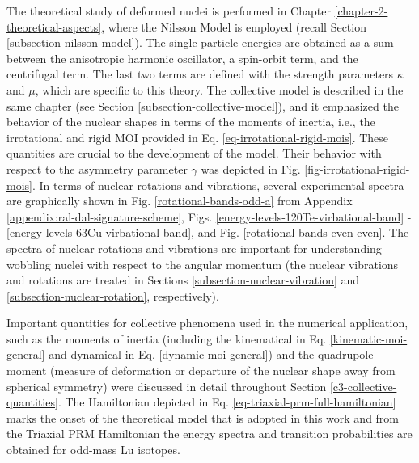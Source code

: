 The theoretical study of deformed nuclei is performed in Chapter \ref{chapter-2-theoretical-aspects}, where the Nilsson Model is employed (recall Section \ref{subsection-nilsson-model}). The single-particle energies are obtained as a sum between the anisotropic harmonic oscillator, a spin-orbit term, and the centrifugal term. The last two terms are defined with the strength parameters $\kappa$ and $\mu$, which are specific to this theory. The collective model is described in the same chapter (see Section \ref{subsection-collective-model}), and it emphasized the behavior of the nuclear shapes in terms of the moments of inertia, i.e., the irrotational and rigid MOI provided in Eq. \eqref{eq-irrotational-rigid-mois}. These quantities are crucial to the development of the model. Their behavior with respect to the asymmetry parameter $\gamma$ was depicted in Fig. \ref{fig-irrotational-rigid-mois}. In terms of nuclear rotations and vibrations, several experimental spectra are graphically shown in Fig. \ref{rotational-bands-odd-a} from Appendix \ref{appendix:ral-dal-signature-scheme}, Figs. \ref{energy-levels-120Te-virbational-band} - \ref{energy-levels-63Cu-virbational-band}, and Fig. \ref{rotational-bands-even-even}. The spectra of nuclear rotations and vibrations are important for understanding wobbling nuclei with respect to the angular momentum (the nuclear vibrations and rotations are treated in Sections \ref{subsection-nuclear-vibration} and \ref{subsection-nuclear-rotation}, respectively). 

Important quantities for collective phenomena used in the numerical application, such as the moments of inertia (including the kinematical in Eq. \eqref{kinematic-moi-general} and dynamical in Eq. \eqref{dynamic-moi-general}) and the quadrupole moment (measure of deformation or departure of the nuclear shape away from spherical symmetry) were discussed in detail throughout Section \ref{c3-collective-quantities}. The Hamiltonian depicted in Eq. \eqref{eq-triaxial-prm-full-hamiltonian} marks the onset of the theoretical model that is adopted in this work and from the Triaxial PRM Hamiltonian the energy spectra and transition probabilities are obtained for odd-mass Lu isotopes.

